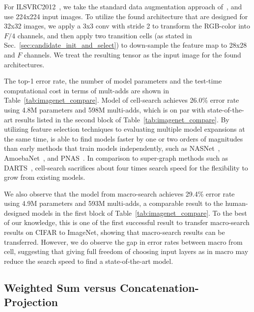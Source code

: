 For ILSVRC2012~\citep{ILSVRC15}, we take the standard data augmentation approach of~\citep{resnet}, and use 224x224 input images. To utilize the found architecture that are designed for 32x32 images, we apply a 3x3 conv with stride 2 to transform the RGB-color into $F / 4$ channels, and then apply two transition cells (as stated in Sec.~\ref{sec:candidate_init_and_select}) to down-sample the feature map to 28x28 and $F$ channels. We treat the resulting tensor as the input image for the found architectures. 

The top-1 error rate, the number of model parameters and the test-time computational cost in terms of mult-adds are shown in Table~\ref{tab:imagenet_compare}. Model of \Petridish cell-search achieves 26.0\% error rate using 4.8M parameters and 598M multi-adds, which is on par with state-of-the-art results listed in the second block of Table~\ref{tab:imagenet_compare}. By utilizing feature selection techniques to evaluating multiple model expansions at the same time, \Petridish is able to find models faster by one or two orders of magnitudes than early methods that train models independently, such as NASNet~\citep{NASCell}, AmoebaNet~\citep{Real2018RegularizedEF}, and PNAS~\citep{Liu2017ProgressiveNA}.  
In comparison to super-graph methods such as DARTS~\citep{Liu2018DARTSDA}, \Petridish cell-search sacrifices about four times search speed for the flexibility to grow from existing models. 

We also observe that the model from \Petridish macro-search achieves 29.4\% error rate using 4.9M parameters and 593M multi-adds, a comparable result to the human-designed models in the first block of Table~\ref{tab:imagenet_compare}. To the best of our knowledge, this is one of the first successful result to transfer macro-search results on CIFAR to ImageNet, showing that macro-search results can be transferred. 
However, we do observe the gap in error rates between \Petridish macro from \Petridish cell, suggesting that giving full freedom of choosing input layers as in \Petridish macro may reduce the search speed to find a state-of-the-art model.


\subsection{Weighted Sum versus Concatenation-Projection}
\label{sec:sum_vs_cat_proj}



